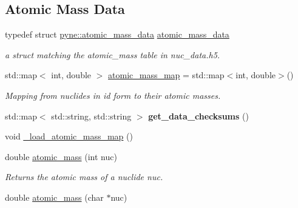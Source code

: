 \subsection*{Atomic Mass Data}
\begin{DoxyCompactItemize}
\item 
typedef struct \hyperlink{structpyne_1_1atomic__mass__data}{pyne\+::atomic\+\_\+mass\+\_\+data} \hyperlink{namespacepyne_a4d33f77321c43a895b32c56b0c4b9256}{atomic\+\_\+mass\+\_\+data}\hypertarget{namespacepyne_a4d33f77321c43a895b32c56b0c4b9256}{}\label{namespacepyne_a4d33f77321c43a895b32c56b0c4b9256}

\begin{DoxyCompactList}\small\item\em a struct matching the atomic\+\_\+mass table in nuc\+\_\+data.\+h5. \end{DoxyCompactList}\item 
std\+::map$<$ int, double $>$ \hyperlink{namespacepyne_ad57b70e4dd814b1efc458ff58641bcef}{atomic\+\_\+mass\+\_\+map} = std\+::map$<$int, double$>$()\hypertarget{namespacepyne_ad57b70e4dd814b1efc458ff58641bcef}{}\label{namespacepyne_ad57b70e4dd814b1efc458ff58641bcef}

\begin{DoxyCompactList}\small\item\em Mapping from nuclides in id form to their atomic masses. \end{DoxyCompactList}\item 
std\+::map$<$ std\+::string, std\+::string $>$ {\bfseries get\+\_\+data\+\_\+checksums} ()\hypertarget{namespacepyne_a7ffac869653ccaac71a565704630ae43}{}\label{namespacepyne_a7ffac869653ccaac71a565704630ae43}

\item 
void \hyperlink{namespacepyne_afc84ecca5a23b416bd3bf42b0756e68e}{\+\_\+load\+\_\+atomic\+\_\+mass\+\_\+map} ()
\item 
double \hyperlink{namespacepyne_aaab79c2417fc60c1a248dd702403befb}{atomic\+\_\+mass} (int nuc)
\begin{DoxyCompactList}\small\item\em Returns the atomic mass of a nuclide {\itshape nuc}. \end{DoxyCompactList}\item 
double \hyperlink{namespacepyne_a070a35bbdb0217ff8c4b222572912f87}{atomic\+\_\+mass} (char $\ast$nuc)\hypertarget{namespacepyne_a070a35bbdb0217ff8c4b222572912f87}{}\label{namespacepyne_a070a35bbdb0217ff8c4b222572912f87}


\end{DoxyCompactItemize}
